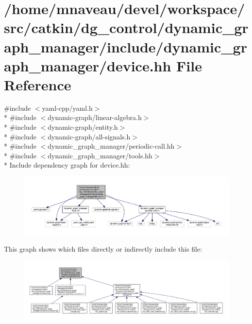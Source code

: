 \hypertarget{device_8hh}{}\section{/home/mnaveau/devel/workspace/src/catkin/dg\+\_\+control/dynamic\+\_\+graph\+\_\+manager/include/dynamic\+\_\+graph\+\_\+manager/device.hh File Reference}
\label{device_8hh}
{\ttfamily \#include $<$yaml-\/cpp/yaml.\+h$>$}\\*
{\ttfamily \#include $<$dynamic-\/graph/linear-\/algebra.\+h$>$}\\*
{\ttfamily \#include $<$dynamic-\/graph/entity.\+h$>$}\\*
{\ttfamily \#include $<$dynamic-\/graph/all-\/signals.\+h$>$}\\*
{\ttfamily \#include $<$dynamic\+\_\+graph\+\_\+manager/periodic-\/call.\+hh$>$}\\*
{\ttfamily \#include $<$dynamic\+\_\+graph\+\_\+manager/tools.\+hh$>$}\\*
Include dependency graph for device.\+hh\+:\nopagebreak
\begin{figure}[H]
\begin{center}
\leavevmode
\includegraphics[width=350pt]{device_8hh__incl}
\end{center}
\end{figure}
This graph shows which files directly or indirectly include this file\+:\nopagebreak
\begin{figure}[H]
\begin{center}
\leavevmode
\includegraphics[width=350pt]{device_8hh__dep__incl}
\end{center}
\end{figure}
